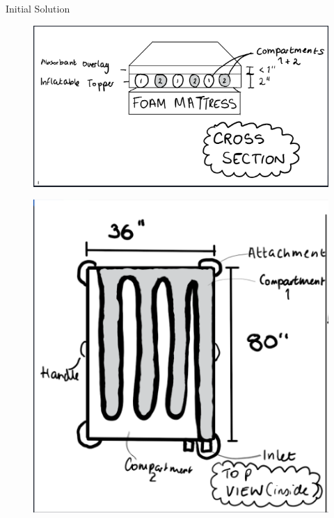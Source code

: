 \documentclass[final]{beamer}
\newlength{\onecolwid}
\newlength{\twocolwid}
\begin{document}
\begin{frame}
\begin{columns}[t]
\begin{column}{\twocolwid}
\begin{columns}[t,totalwidth=\twocolwid]
\begin{column}{\onecolwid}
\begin{block}{Initial Solution}
\begin{figure}
\includegraphics[width=\linewidth]{img/crosssection.PNG}
\end{figure}
\begin{figure}
\includegraphics[width=1\linewidth]{img/top.PNG}
\end{figure}

\end{block}





\end{column}
\end{columns}
\end{column}
\end{columns}
\end{frame}
\end{document}
